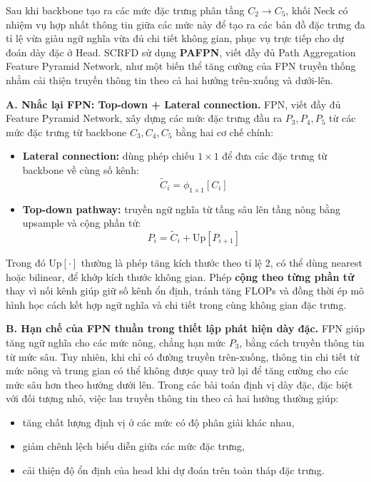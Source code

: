 Sau khi backbone tạo ra các mức đặc trưng phân tầng $C_2 \rightarrow C_5$, khối Neck có nhiệm vụ hợp nhất thông tin giữa các mức này để tạo ra các bản đồ đặc trưng đa tỉ lệ vừa giàu ngữ nghĩa vừa đủ chi tiết không gian, phục vụ trực tiếp cho dự đoán dày đặc ở Head. 
SCRFD sử dụng \textbf{PAFPN}, viết đầy đủ Path Aggregation Feature Pyramid Network, như một biến thể tăng cường của FPN truyền thống nhằm cải thiện truyền thông tin theo cả hai hướng trên-xuống và dưới-lên. \cite{guo2022scrfd}

\medskip
\noindent\textbf{A. Nhắc lại FPN: Top-down + Lateral connection.}
FPN, viết đầy đủ Feature Pyramid Network, xây dựng các mức đặc trưng đầu ra $P_3, P_4, P_5$ từ các mức đặc trưng từ backbone $C_3, C_4, C_5$ bằng hai cơ chế chính:

\begin{itemize}
  \item \textbf{Lateral connection:} dùng phép chiếu $1\times1$ để đưa các đặc trưng từ backbone về cùng số kênh:
  \[
  \tilde{C}_i = \phi_{1\times1}[C_i]
  \]
  \item \textbf{Top-down pathway:} truyền ngữ nghĩa từ tầng sâu lên tầng nông bằng upsample và cộng phần tử:
  \[
  P_i = \tilde{C}_i + \text{Up}[P_{i+1}]
  \]
\end{itemize}

Trong đó $\text{Up}[\cdot]$ thường là phép tăng kích thước theo tỉ lệ 2, có thể dùng nearest hoặc bilinear, để khớp kích thước không gian. 
Phép \textbf{cộng theo từng phần tử} thay vì nối kênh giúp giữ số kênh ổn định, tránh tăng FLOPs và đồng thời ép mô hình học cách kết hợp ngữ nghĩa và chi tiết trong cùng không gian đặc trưng.

\medskip
\noindent\textbf{B. Hạn chế của FPN thuần trong thiết lập phát hiện dày đặc.}
FPN giúp tăng ngữ nghĩa cho các mức nông, chẳng hạn mức $P_3$, bằng cách truyền thông tin từ mức sâu. Tuy nhiên, khi chỉ có đường truyền trên-xuống, thông tin chi tiết từ mức nông và trung gian có thể không được quay trở lại để tăng cường cho các mức sâu hơn theo hướng dưới lên. 
Trong các bài toán định vị dày đặc, đặc biệt với đối tượng nhỏ, việc lan truyền thông tin theo cả hai hướng thường giúp:

\begin{itemize}
  \item tăng chất lượng định vị ở các mức có độ phân giải khác nhau,
  \item giảm chênh lệch biểu diễn giữa các mức đặc trưng,
  \item cải thiện độ ổn định của head khi dự đoán trên toàn tháp đặc trưng.
\end{itemize}

